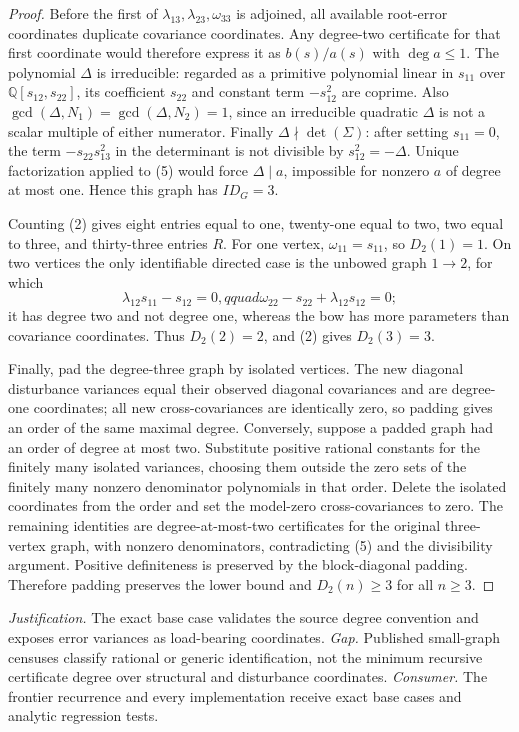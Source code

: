 \documentclass{article}
\begin{document}
\begin{proof}
Before the first of \(\lambda_{13},\lambda_{23},\omega_{33}\) is adjoined, all available root-error coordinates duplicate covariance coordinates.  Any degree-two certificate for that first coordinate would therefore express it as \(b(s)/a(s)\) with \(\deg a\leq1\).  The polynomial \(\Delta\) is irreducible: regarded as a primitive polynomial linear in \(s_{11}\) over \(\mathbb Q[s_{12},s_{22}]\), its coefficient \(s_{22}\) and constant term \(-s_{12}^2\) are coprime.  Also \(\gcd(\Delta,N_1)=\gcd(\Delta,N_2)=1\), since an irreducible quadratic \(\Delta\) is not a scalar multiple of either numerator.  Finally \(\Delta\nmid\det(\Sigma)\): after setting \(s_{11}=0\), the term \(-s_{22}s_{13}^2\) in the determinant is not divisible by \(s_{12}^2=-\Delta\).  Unique factorization applied to (5) would force \(\Delta\mid a\), impossible for nonzero \(a\) of degree at most one.  Hence this graph has \(ID_G=3\).

Counting (2) gives eight entries equal to one, twenty-one equal to two, two equal to three, and thirty-three entries \(R\).  For one vertex, \(\omega_{11}=s_{11}\), so \(D_2(1)=1\).  On two vertices the only identifiable directed case is the unbowed graph \(1\to2\), for which
\[
 \lambda_{12}s_{11}-s_{12}=0,qquad
 \omega_{22}-s_{22}+\lambda_{12}s_{12}=0;
\]
it has degree two and not degree one, whereas the bow has more parameters than covariance coordinates.  Thus \(D_2(2)=2\), and (2) gives \(D_2(3)=3\).

Finally, pad the degree-three graph by isolated vertices.  The new diagonal disturbance variances equal their observed diagonal covariances and are degree-one coordinates; all new cross-covariances are identically zero, so padding gives an order of the same maximal degree.  Conversely, suppose a padded graph had an order of degree at most two.  Substitute positive rational constants for the finitely many isolated variances, choosing them outside the zero sets of the finitely many nonzero denominator polynomials in that order.  Delete the isolated coordinates from the order and set the model-zero cross-covariances to zero.  The remaining identities are degree-at-most-two certificates for the original three-vertex graph, with nonzero denominators, contradicting (5) and the divisibility argument.  Positive definiteness is preserved by the block-diagonal padding.  Therefore padding preserves the lower bound and \(D_2(n)\geq3\) for all \(n\geq3\).
\end{proof}
\par\smallskip\noindent \textit{Justification.} The exact base case validates the source degree convention and exposes error variances as load-bearing coordinates. \textit{Gap.} Published small-graph censuses classify rational or generic identification, not the minimum recursive certificate degree over structural and disturbance coordinates. \textit{Consumer.} The frontier recurrence and every implementation receive exact base cases and analytic regression tests.
\end{document}
